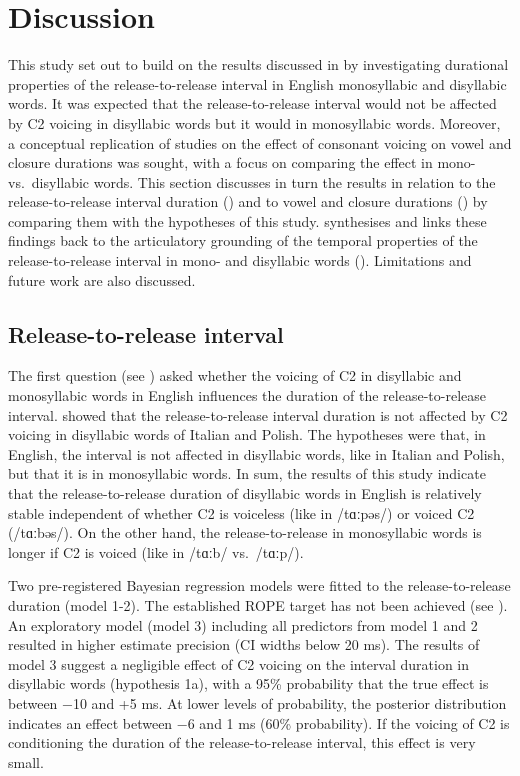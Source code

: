 \documentclass[12pt,a4paper,]{article}
\begin{document}
\hypertarget{discussion}{%
\section{Discussion}\label{discussion}}

This study set out to build on the results discussed in
\citet{coretta2019k} by investigating durational properties of the
release-to-release interval in English monosyllabic and disyllabic
words. It was expected that the release-to-release interval would not be
affected by C2 voicing in disyllabic words but it would in monosyllabic
words. Moreover, a conceptual replication of studies on the effect of
consonant voicing on vowel and closure durations was sought, with a
focus on comparing the effect in mono- vs.~disyllabic words. This
section discusses in turn the results in relation to the
release-to-release interval duration () and to vowel and
closure durations () by comparing them with the
hypotheses of this study.  synthesises and links these
findings back to the articulatory grounding of the temporal properties
of the release-to-release interval in mono- and disyllabic words
(). Limitations and future work are also discussed.

\hypertarget{release-to-release-interval}{%
\subsection{Release-to-release
interval}\label{release-to-release-interval}}

\label{s:rr-disc}

The first question (see ) asked whether the voicing of C2
in disyllabic and monosyllabic words in English influences the duration
of the release-to-release interval. \citet{coretta2019k} showed that the
release-to-release interval duration is not affected by C2 voicing in
disyllabic words of Italian and Polish. The hypotheses were that, in
English, the interval is not affected in disyllabic words, like in
Italian and Polish, but that it is in monosyllabic words. In sum, the
results of this study indicate that the release-to-release duration of
disyllabic words in English is relatively stable independent of whether
C2 is voiceless (like in /tɑːpəs/) or voiced C2 (/tɑːbəs/). On the other
hand, the release-to-release in monosyllabic words is longer if C2 is
voiced (like in /tɑːb/ vs.~/tɑːp/).

Two pre-registered Bayesian regression models were fitted to the
release-to-release duration (model 1-2). The established ROPE target has
not been achieved (see ). An exploratory model
(model 3) including all predictors from model 1 and 2 resulted in higher
estimate precision (CI widths below 20 ms). The results of model 3
suggest a negligible effect of C2 voicing on the interval duration in
disyllabic words (hypothesis 1a), with a 95\% probability that the true
effect is between −10 and +5 ms. At lower levels of probability, the
posterior distribution indicates an effect between −6 and 1 ms (60\%
probability). If the voicing of C2 is conditioning the duration of the
release-to-release interval, this effect is very small.
\end{document}
